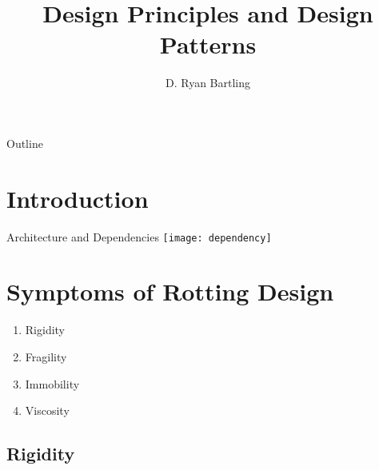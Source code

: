 \documentclass[xcolor=svgnames, handout]{beamer}
\title
    [Design Principles\hspace{2em}]
    {Design Principles and Design Patterns}
\author
    [Ryan Bartling]
    {D. Ryan Bartling}
\begin{document}

\maketitle

\setcounter{tocdepth}{1}
\begin{frame}{Outline}
    \tableofcontents
\end{frame}


\section{Introduction}


\begin{frame}{Architecture and Dependencies}
    \centering
    \texttt{[image: dependency]}
\end{frame}


\section[Rotting Code]{Symptoms of Rotting Design}


\begin{frame}{\secname}
    \begin{enumerate}
        \pause \item Rigidity
        \pause \item Fragility
        \pause \item Immobility
        \pause \item Viscosity
    \end{enumerate}
\end{frame}


\subsection{Rigidity}
\end{document}
